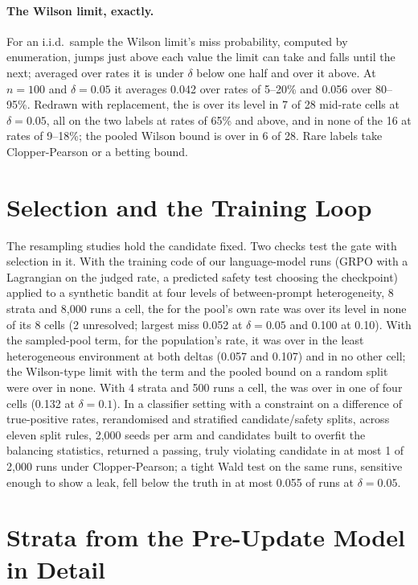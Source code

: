 \paragraph{The Wilson limit, exactly.} For an i.i.d.\ sample the Wilson limit's miss probability, computed by
enumeration, jumps just above each value the limit can take and falls until the next; averaged over rates it is under
$\delta$ below one half and over it above. At $n=100$ and $\delta=0.05$ it averages 0.042 over rates of 5--20\% and 0.056
over 80--95\%. Redrawn with replacement, the \SWL{} is over its level in 7 of 28 mid-rate cells at $\delta=0.05$, all on
the two labels at rates of 65\% and above, and in none of the 16 at rates of 9--18\%; the pooled Wilson bound is over in
6 of 28. Rare labels take Clopper-Pearson or a betting bound.

\section{Selection and the Training Loop}
\label{app:pipeline}

The resampling studies hold the candidate fixed. Two checks test the gate with selection in it. With the training code of
our language-model runs (GRPO with a Lagrangian on the judged rate, a predicted safety test choosing the checkpoint)
applied to a synthetic bandit at four levels of between-prompt heterogeneity, 8 strata and 8,000 runs a cell, the \SWT{}
for the pool's own rate was over its level in none of its 8 cells (2 unresolved; largest miss 0.052 at $\delta=0.05$
and 0.100 at 0.10). With the sampled-pool term, for the population's rate, it was over in the least heterogeneous
environment at both deltas (0.057 and 0.107) and in no other cell; the Wilson-type limit with the term and the pooled
bound on a random split were over in none. With 4 strata and 500 runs a cell, the \SWT{} was over in one of four cells
(0.132 at $\delta=0.1$). In a classifier setting with a constraint on a difference of true-positive rates,
rerandomised and stratified candidate/safety splits, across eleven split rules, 2,000 seeds per arm and candidates built
to overfit the balancing statistics, returned a passing, truly violating candidate in at most 1 of 2,000 runs under
Clopper-Pearson; a tight Wald test on the same runs, sensitive enough to show a leak, fell below the truth in at most
0.055 of runs at $\delta=0.05$.

\section{Strata from the Pre-Update Model in Detail}
\label{app:strata}

